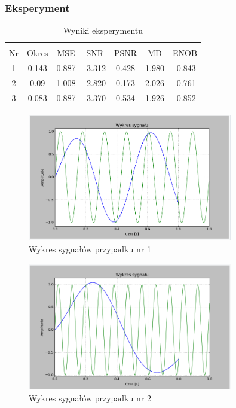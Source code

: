 \documentclass{article}
\begin{document}
    \subsubsection{Eksperyment}

    \begin{table}[h!]
        \centering
        \vspace{0.2cm}
        \begin{tabular}{|c|c|c|c|c|c|c|}
            \hline\hline\\[-0.4cm]
            Nr & Okres & MSE & SNR & PSNR & MD & ENOB  \\
            \hline
            1 & 0.143 & 0.887 & -3.312 & 0.428 & 1.980 & -0.843 \\
            \hline
            2 & 0.09 & 1.008 & -2.820 & 0.173 & 2.026 & -0.761  \\
            \hline
            3 & 0.083 & 0.887 & -3.370 & 0.534 & 1.926 & -0.852   \\
            \hline
        \end{tabular}
        \caption{Wyniki eksperymentu}
    \end{table}
    \FloatBarrier

    \begin{figure}[h!]
        \centering
        \includegraphics[width=0.8\textwidth]{img/1/anti_1.png}
        \caption{Wykres sygnałów przypadku nr 1}
    \end{figure}
    \FloatBarrier

    \begin{figure}[h!]
        \centering
        \includegraphics[width=0.8\textwidth]{img/1/anti_2.png}
        \caption{Wykres sygnałów przypadku nr 2}
    \end{figure}
    \FloatBarrier
\end{document}
